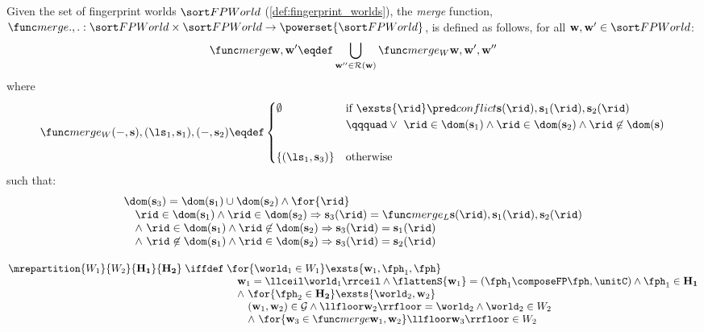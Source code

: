 \begin{definition}
Given the set of fingerprint worlds $\FPWorlds$ (\ref{def:fingerprint_worlds}), the \emph{merge} function, $\mergeW{.}{.}: \FPWorlds \times \FPWorlds \rightarrow \powerset{\FPWorlds}$, is defined as follows, for all $\fpw, \fpw' \in \FPWorlds$:
%
\[
	\mergeW{\fpw}{\fpw'} \eqdef \bigcup\limits_{\fpw'' \in \myrely(\fpw)} \mergeWAux{\fpw}{\fpw'}{\fpw''}
\]
%
where
%
\[
	\mergeWAux{(-, \fpgs)}{(\ls_1, \fpgs_1)}{(-, \fpgs_2)} \eqdef 
	\begin{cases}
		\emptyset & \text{if } \exsts{\rid} \conflict{\fpgs(\rid)}{\fpgs_1(\rid)}{\fpgs_2(\rid)} \\
		& \qqquad \lor\ \rid \in \dom(\fpgs_1) \land \rid \in \dom(\fpgs_2) \land \rid \not\in \dom(\fpgs) \\\\
		\{(\ls_1, \fpgs_3)\} & \text{otherwise}
	\end{cases}
\]
%
such that:
\[
\begin{array}{l}
	\dom(\fpgs_3) = \dom(\fpgs_1) \cup \dom(\fpgs_2) \land \for{\rid}\\
	\quad \rid \in \dom(\fpgs_1) \land \rid \in \dom(\fpgs_2) \Rightarrow \fpgs_3(\rid) = \mergeLS{\fpgs(\rid)}{\fpgs_1(\rid)}{\fpgs_2(\rid)} \\
	\quad \land\ \rid \in \dom(\fpgs_1) \land \rid \not\in \dom(\fpgs_2) \Rightarrow 	\fpgs_3(\rid) = \fpgs_1(\rid) \\
	\quad \land\ \rid \not\in \dom(\fpgs_1) \land \rid \in \dom(\fpgs_2) \Rightarrow 	\fpgs_3(\rid) = \fpgs_2(\rid)
\end{array}
\]
\end{definition}
%
%
\begin{definition}[Repartitioning]
\[
	\mrepartition{W_1 }{W_2}{\mathbf{H_1}}{\mathbf{H_2}} \; \iffdef \;
	\begin{array}[t]{@{} l @{}}
		\for{\world_1 \in W_1} \exsts{\fpw_1, \fph_1, \fph}\\
		\quad \fpw_1 = \lift{\world_1} \land \flattenS{\fpw_1} = (\fph_1 \composeFP \fph, \unitC) \land \fph_1 \in \mathbf{H_1} \\
		\quad \land\ \for{\fph_2 \in \mathbf{H_2}} \exsts{\world_2, \fpw_2} \\
		\qquad (\fpw_1, \fpw_2) \in \myguar \land \erase{\fpw_2} = \world_2 \land \world_2 \in W_2 \\
		\qquad \land\ \for{\fpw_3 \in \mergeW{\fpw_1}{\fpw_2}} \erase{\fpw_3} \in W_2
	\end{array}
\]
\end{definition}
